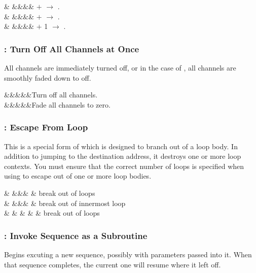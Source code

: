 \documentclass[letterpaper,twoside,onecolumn,openright,final]{memoir}
\begin{document}
{\begin{opdesc}
   &            &&&\z{\$,\$}&  $+$  $\rightarrow$ .\\
   &    &&&\z{\$,\#}&  $+$  $\rightarrow$ .\\
   &            &&&\z{\$}&  $+$ 1 $\rightarrow$ .\\
\end{opdesc}

\subsubsection{: Turn Off All Channels at Once}
All channels are immediately turned off, or in the case of , all channels are smoothly
faded down to off.

\begin{opdesc}
   &&&&&Turn off all channels.\\
   &&&&&Fade all channels to zero.\\
\end{opdesc}

\subsubsection{: Escape From Loop}
This is a special form of  which is designed to branch out of a loop body.
In addition to jumping to the destination address, it destroys one or more loop contexts.  You must
ensure that the correct number of loops is specified when using  to escape out
of one or more loop bodies.

\begin{opdesc}
   &  &&&\z{,\$} &  break out of  loops\\
   &  &&&        & break out of innermost loop\\
   &  &  & &\z{,\#} & break out of  loops\\
\end{opdesc}

\subsubsection{: Invoke Sequence as a Subroutine}
Begins excuting a new sequence, possibly with parameters passed into it.
When that sequence completes, the current one will resume where it left off.

}
\end{document}
